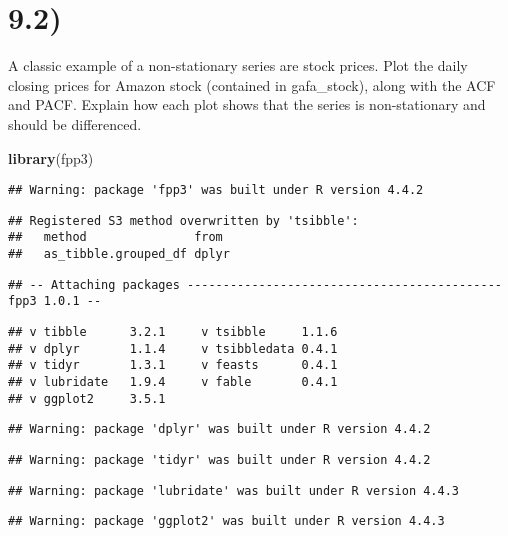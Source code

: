 \documentclass[
]{article}
\newenvironment{Shaded}{\begin{snugshade}}{\end{snugshade}}
\newcommand{\FunctionTok}[1]{\textcolor[rgb]{0.13,0.29,0.53}{\textbf{#1}}}
\newcommand{\NormalTok}[1]{#1}
\begin{document}
\section{9.2)}\label{section-1}

A classic example of a non-stationary series are stock prices. Plot the
daily closing prices for Amazon stock (contained in gafa\_stock), along
with the ACF and PACF. Explain how each plot shows that the series is
non-stationary and should be differenced.

\begin{Shaded}
\begin{Highlighting}[]
\FunctionTok{library}\NormalTok{(fpp3)}
\end{Highlighting}
\end{Shaded}

\begin{verbatim}
## Warning: package 'fpp3' was built under R version 4.4.2
\end{verbatim}

\begin{verbatim}
## Registered S3 method overwritten by 'tsibble':
##   method               from 
##   as_tibble.grouped_df dplyr
\end{verbatim}

\begin{verbatim}
## -- Attaching packages -------------------------------------------- fpp3 1.0.1 --
\end{verbatim}

\begin{verbatim}
## v tibble      3.2.1     v tsibble     1.1.6
## v dplyr       1.1.4     v tsibbledata 0.4.1
## v tidyr       1.3.1     v feasts      0.4.1
## v lubridate   1.9.4     v fable       0.4.1
## v ggplot2     3.5.1
\end{verbatim}

\begin{verbatim}
## Warning: package 'dplyr' was built under R version 4.4.2
\end{verbatim}

\begin{verbatim}
## Warning: package 'tidyr' was built under R version 4.4.2
\end{verbatim}

\begin{verbatim}
## Warning: package 'lubridate' was built under R version 4.4.3
\end{verbatim}

\begin{verbatim}
## Warning: package 'ggplot2' was built under R version 4.4.3
\end{verbatim}
\end{document}
